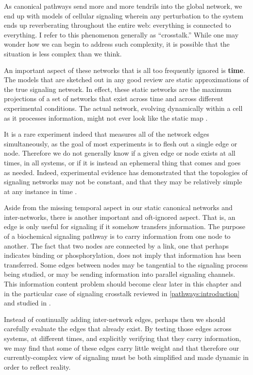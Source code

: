 As canonical pathways send more and more tendrils into the global network,
we end up with models of cellular signaling wherein any perturbation
to the system ends up reverberating throughout the entire web: everything is
connected to everything. I refer to this phenomenon generally as ``crosstalk.''
While one may wonder how we can begin to address
such complexity, it is possible that the situation is less complex than we think.


An important aspect of these networks that is all too frequently ignored 
is \textbf{time}. The models that are sketched out
in any good review are static approximations of the true signaling
network. In effect, these static
networks are the maximum projections of a set of networks that exist across time
and across different experimental conditions. The actual network, evolving dynamically within
a cell as it processes information, might not ever look like the static map .


It is a rare experiment indeed that
measures all of the network edges simultaneously, as the goal
of most experiments is to flesh out a single edge or node. Therefore
we do not generally know if a given edge or node exists at all times, in all
systems, or if it is instead an ephemeral thing that comes and goes
as needed. Indeed, experimental evidence has demonstrated that the topologies of
signaling networks may not be constant, and that they may be
relatively simple at any instance in time \cite{Ideker2012,Ku2012}.


Aside from the missing temporal aspect in our static canonical networks
and inter-networks, there is another important and oft-ignored aspect.
That is, an edge is only useful for signaling if it
somehow transfers \b{information}. The purpose of a biochemical
signaling pathway is to carry information from one node to another.
The fact that two nodes are connected by a link, one that perhaps indicates binding
or phosphorylation, does not imply that information has been transferred.
Some edges between nodes may be tangential to the signaling process being studied,
or may be sending information into parallel signaling channels.
This information content problem should become clear later in this chapter and
in the particular case of signaling crosstalk reviewed in \autoref{pathways:introduction}
and studied in .


Instead of continually adding inter-network
edges, perhaps then we should carefully evaluate the edges
that already exist. By testing those edges across systems, at different times,
and explicitly verifying that they carry information, we may find that
some of these edges carry little weight and that therefore our
currently-complex view of signaling
must be both simplified and made dynamic in order to reflect reality.



